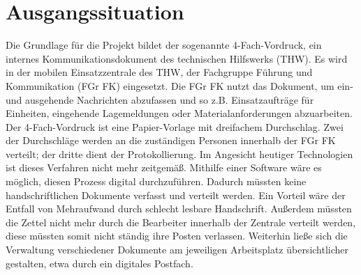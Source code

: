 \section{Ausgangssituation}
Die Grundlage für die Projekt bildet der sogenannte 4-Fach-Vordruck, ein internes Kommunikationsdokument des technischen Hilfswerks (THW). Es wird in der mobilen Einsatzzentrale des THW, der Fachgruppe Führung und Kommunikation (FGr FK) eingesetzt. Die FGr FK nutzt das Dokument, um ein- und ausgehende Nachrichten abzufassen und so z.B. Einsatzaufträge für Einheiten, eingehende Lagemeldungen oder Materialanforderungen abzuarbeiten. Der 4-Fach-Vordruck ist eine Papier-Vorlage mit dreifachem Durchschlag. Zwei der Durchschläge werden an die zuständigen Personen innerhalb der FGr FK verteilt; der dritte dient der Protokollierung. Im Angesicht heutiger Technologien ist dieses Verfahren nicht mehr zeitgemäß. Mithilfe einer Software wäre es möglich, diesen Prozess digital durchzuführen. Dadurch müssten keine handschriftlichen Dokumente verfasst und verteilt werden. Ein Vorteil wäre der Entfall von Mehraufwand durch schlecht lesbare Handschrift. Außerdem müssten die Zettel nicht mehr durch die Bearbeiter innerhalb der Zentrale verteilt werden, diese müssten somit nicht ständig ihre Posten verlassen. Weiterhin ließe sich die Verwaltung verschiedener Dokumente am jeweiligen Arbeitsplatz übersichtlicher gestalten, etwa durch ein digitales Postfach.